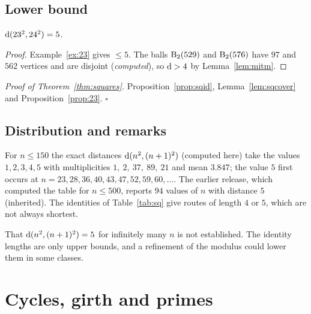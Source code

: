 \subsection{Lower bound}
\begin{proposition}\label{prop:23}
$\operatorname{d}(23^2,24^2)=5$.
\end{proposition}
\begin{proof} Example~\ref{ex:23} gives $\le5$. The balls $\operatorname{B}_2(529)$ and $\operatorname{B}_2(576)$ have $97$ and $562$ vertices and are disjoint (\emph{computed}), so $\operatorname{d}>4$ by Lemma~\ref{lem:mitm}. \end{proof}
\emph{Proof of Theorem~\ref{thm:squares}.} Proposition~\ref{prop:sqid}, Lemma~\ref{lem:sqcover} and Proposition~\ref{prop:23}. \hfill$\square$

\subsection{Distribution and remarks}
For $n\le150$ the exact distances $\operatorname{d}(n^2,(n+1)^2)$ (computed here) take the values $1,2,3,4,5$ with multiplicities $1,\ 2,\ 37,\ 89,\ 21$ and mean $3.847$; the value $5$ first occurs at $n=23,28,36,40,43,47,52,59,60,\dots$. The earlier release, which computed the table for $n\le500$, reports $94$ values of $n$ with distance $5$ (inherited). The identities of Table~\ref{tab:sq} give routes of length $4$ or $5$, which are not always shortest.
\begin{remark}
That $\operatorname{d}(n^2,(n+1)^2)=5$ for infinitely many $n$ is not established. The identity lengths are only upper bounds, and a refinement of the modulus could lower them in some classes.
\end{remark}
\begin{table}[ht]\centering\small

\caption{The 24 square identities: labels $N_i(t)$ of the route from $n^2$ to $(n+1)^2$, $n=24t+r$. Intermediate states are in Appendix~\ref{app:sq}.}\label{tab:sq}\end{table}

\section{Cycles, girth and primes}\label{sec:cycles}
